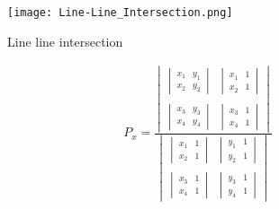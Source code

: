 \begin{figure}
    \centering
    \texttt{[image: Line-Line\_Intersection.png]}
    \caption{Line line intersection}
    \label{fig:linelineintersect}
\end{figure}

\[
\begin{array}{ll}
P_x = \frac{\begin{vmatrix} 
                \begin{vmatrix} x_1 & y_1\\
                                x_2 & y_2
                \end{vmatrix} & 
                \begin{vmatrix} x_1 & 1\\
                                x_2 & 1
                \end{vmatrix} \\\\ 
                \begin{vmatrix} x_3 & y_3\\
                                x_4 & y_4
                \end{vmatrix} & 
                \begin{vmatrix} x_3 & 1\\
                                x_4 & 1
                \end{vmatrix} 
            \end{vmatrix} }{
            \begin{vmatrix} 
                \begin{vmatrix} x_1 & 1\\
                               x_2 & 1
                \end{vmatrix} &  
                \begin{vmatrix} y_1 & 1\\
                                y_2 & 1
             \end{vmatrix} \\\\ 
             \begin{vmatrix} x_3 & 1\\
                             x_4 & 1
             \end{vmatrix} & 
             \begin{vmatrix} y_3 & 1\\
                             y_4 & 1 
             \end{vmatrix} 
            \end{vmatrix}}


\end{array}\]
